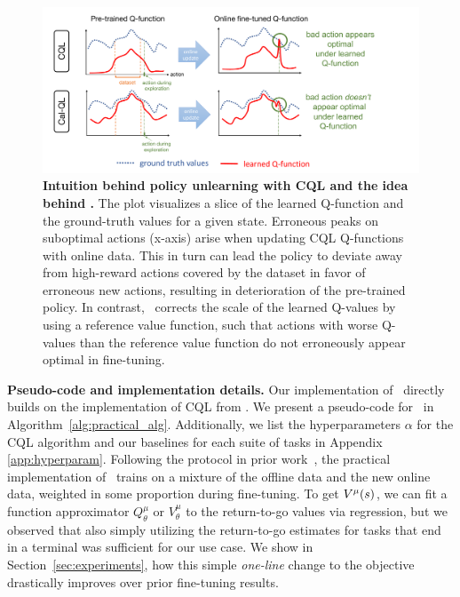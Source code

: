 \begin{figure}
\centering
\vspace{-0.4cm}
\includegraphics[trim={0 0 2.7cm 0},clip,width=0.98\linewidth]{chapters/cal_ql/figs-sample/figure_for_calql_final.pdf}
\vspace{-0.2cm}
\caption{
\footnotesize{\textbf{Intuition behind policy unlearning with CQL and the idea behind \methodname.} The plot visualizes a slice of the learned Q-function and the ground-truth values for a given state. Erroneous peaks on suboptimal actions (x-axis) arise when updating CQL Q-functions with online data. This in turn can lead the policy to deviate away from high-reward actions covered by the dataset in favor of erroneous new actions, resulting in deterioration of the pre-trained policy. In contrast, \methodname\ corrects the scale of the learned Q-values by using a reference value function, such that actions with worse Q-values than the reference value function do not erroneously appear optimal in fine-tuning.}}
\label{fig:calql_idea}
\vspace{-0.4cm}
\end{figure}

\noindent \textbf{Pseudo-code and implementation details.} Our implementation of \methodname\ directly builds on the implementation of CQL from \citet{geng2022jaxcql}. We present a pseudo-code for \methodname\ in Algorithm~\ref{alg:practical_alg}. Additionally, we list the hyperparameters $\alpha$ for the CQL algorithm and our baselines for each suite of tasks in Appendix \ref{app:hyperparam}. Following the protocol in prior work~\citep{kostrikov2021offlineb,song2023hybrid}, the practical implementation of \methodname\ trains on a mixture of the offline data and the new online data, weighted in some proportion during fine-tuning. To get $V^\mu(s)$, we can fit a function approximator $Q^\mu_\theta$ or $V^\mu_\theta$ to the return-to-go values via regression, but we observed that also simply utilizing the return-to-go estimates for tasks that end in a terminal was sufficient for our use case. We show in  Section~\ref{sec:experiments}, how this simple \emph{one-line} change to the objective drastically improves over prior fine-tuning results.

\vspace{-0.2cm}